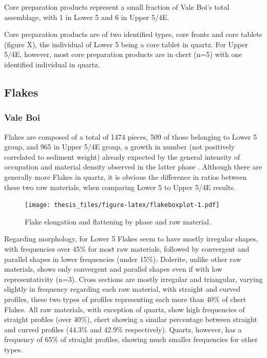 \documentclass[12pt,twoside]{reedthesis}
\begin{document}
Core preparation products represent a small fraction of Vale Boi's total assemblage, with 1 in Lower 5 and 6 in Upper 5/4E.

Core preparation products are of two identified types, core fronts and core tablets (figure X), the individual of Lower 5 being a core tablet in quartz. For Upper 5/4E, however, most core preparation products are in chert (n=5) with one identified individual in quartz.
\begin{table}

\caption{\label{tab:coreprep}Core preparation products by raw material for Upper 5/4E.}
\centering
{}
\end{table}
\hypertarget{flakes}{%
\subsection{Flakes}\label{flakes}}

\hypertarget{vale-boi-5}{%
\subsubsection{Vale Boi}\label{vale-boi-5}}

Flakes are composed of a total of 1474 pieces, 509 of those belonging to Lower 5 group, and 965 in Upper 5/4E group, a growth in number (not positively correlated to sediment weight) already expected by the general intensity of occupation and material density observed in the latter phase . Although there are generally more Flakes in quartz, it is obvious the difference in ratios between these two raw materials, when comparing Lower 5 to Upper 5/4E results.
\begin{figure}
\centering
\texttt{[image: thesis\_files/figure-latex/flakeboxplot-1.pdf]}
\caption{\label{fig:flakeboxplot}Flake elongation and flattening by phase and raw material.}
\end{figure}
Regarding morphology, for Lower 5 Flakes seem to have mostly irregular shapes, with frequencies over 45\% for most raw materials, followed by convergent and parallel shapes in lower frequencies (under 15\%). Dolerite, unlike other raw materials, shows only convergent and parallel shapes even if with low representativity (n=3). Cross sections are mostly irregular and triangular, varying slightly in frequency regarding each raw material, with straight and curved profiles, these two types of profiles representing each more than 40\% of chert Flakes. All raw materials, with exception of quartz, show high frequencies of straight profiles (over 40\%), chert showing a similar percentage between straight and curved profiles (44.3\% and 42.9\% respectively). Quartz, however, has a frequency of 65\% of straight profiles, showing much smaller frequencies for other types.
\end{document}

